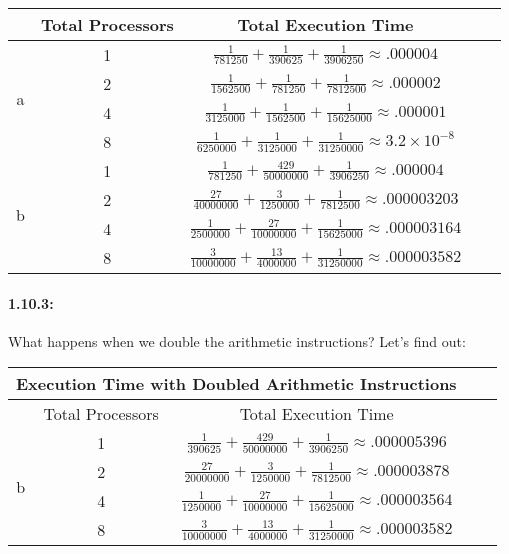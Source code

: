 \documentclass[a4paper]{article}
\begin{document}
\begin{center}
\begin{tabular}{|c|c|c|c|c|c|}
\hline
& Total Processors & \multicolumn{2}{|c|}{Total Execution Time}\\
\hline
\hline
\multirow{4}{*}{a} & 1 & \multicolumn{2}{|c|}{$\frac{1}{781250} + \frac{1}{390625} + \frac{1}{3906250} \approx .000004$}\\
& 2 & \multicolumn{2}{|c|}{$\frac{1}{1562500} + \frac{1}{781250} + \frac{1}{7812500} \approx .000002$}\\
& 4 & \multicolumn{2}{|c|}{$\frac{1}{3125000} + \frac{1}{1562500} + \frac{1}{15625000} \approx .000001$}\\
& 8 & \multicolumn{2}{|c|}{$\frac{1}{6250000} + \frac{1}{3125000} + \frac{1}{31250000} \approx 3.2\times10^{-8}$}\\
\hline
\hline
\multirow{4}{*}{b} & 1 & \multicolumn{2}{|c|}{$\frac{1}{781250} + \frac{429}{50000000} + \frac{1}{3906250} \approx .000004$}\\
& 2 & \multicolumn{2}{|c|}{$\frac{27}{40000000} + \frac{3}{1250000} + \frac{1}{7812500} \approx .000003203$}\\
& 4 & \multicolumn{2}{|c|}{$\frac{1}{2500000} + \frac{27}{10000000} + \frac{1}{15625000} \approx .000003164$}\\
& 8 & \multicolumn{2}{|c|}{$\frac{3}{10000000} + \frac{13}{4000000} + \frac{1}{31250000} \approx .000003582$}\\
\hline
\end{tabular}
\end{center}

\paragraph*{1.10.3:} What happens when we double the arithmetic instructions? Let's find out:

\begin{center}
\begin{tabular}{|c|c|c|c|c|c|}
\hline
\multicolumn{4}{|c|}{Execution Time with Doubled Arithmetic Instructions}\\
\hline
\hline
& Total Processors & \multicolumn{2}{|c|}{Total Execution Time}\\
\hline
\multirow{4}{*}{b} & 1 & \multicolumn{2}{|c|}{$\frac{1}{390625} + \frac{429}{50000000} + \frac{1}{3906250} \approx .000005396$}\\
& 2 & \multicolumn{2}{|c|}{$\frac{27}{20000000} + \frac{3}{1250000} + \frac{1}{7812500} \approx .000003878$}\\
& 4 & \multicolumn{2}{|c|}{$\frac{1}{1250000} + \frac{27}{10000000} + \frac{1}{15625000} \approx .000003564$}\\
& 8 & \multicolumn{2}{|c|}{$\frac{3}{10000000} + \frac{13}{4000000} + \frac{1}{31250000} \approx .000003582$}\\
\hline
\end{tabular}
\end{center}
\end{document}
